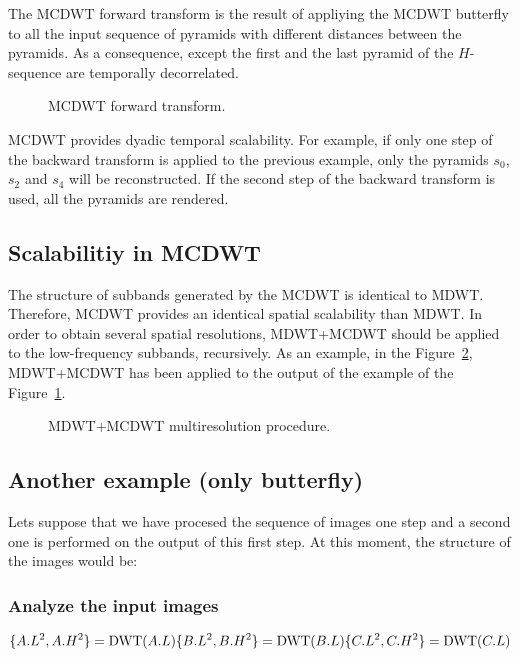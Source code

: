 The MCDWT forward transform is the result of appliying the MCDWT
butterfly to all the input sequence of pyramids with different
distances between the pyramids. As a consequence, except the first and
the last pyramid of the $H$-sequence are temporally decorrelated.

\begin{figure}
\centering
{}
\caption{MCDWT forward transform.\label{fig:forward_MCDWT}}
\end{figure}


MCDWT provides dyadic temporal scalability. For example, if only one step of the backward transform is applied to the previous example, only the pyramids $s_0$, $s_2$ and $s_4$ will be reconstructed. If the second step of the backward transform is used, all the pyramids are rendered.

\subsection{Scalabilitiy in MCDWT}
The structure of subbands generated by the MCDWT is identical to
MDWT. Therefore, MCDWT provides an identical spatial scalability than
MDWT. In order to obtain several spatial resolutions, MDWT+MCDWT
should be applied to the low-frequency subbands, recursively. As an
example, in the Figure~\ref{fig:multiresolution}, MDWT+MCDWT has been
applied to the output of the example of the
Figure~\ref{fig:forward_MCDWT}.

\begin{figure}
\centering
{}
\caption{MDWT+MCDWT multiresolution procedure.\label{fig:multiresolution}}
\end{figure}



\subsection{Another example (only butterfly)}
Lets suppose that we have procesed the sequence of images one step and a
second one is performed on the output of this first step. At this
moment, the structure of the images would be:

\subsubsection{Analyze the input images}
\begin{equation}
  \{A.L^2, A.H^2\} = \text{DWT}(A.L)\\
  \{B.L^2, B.H^2\} = \text{DWT}(B.L)\\
  \{C.L^2, C.H^2\} = \text{DWT}(C.L)
\end{equation}

